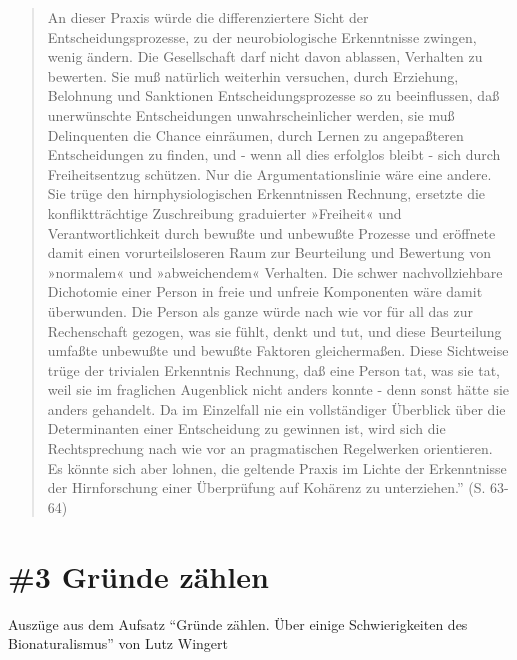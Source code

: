 \documentclass[
  a4paper,
]{report}
\begin{document}
\begin{quote}
An dieser Praxis würde die differenziertere Sicht der Entscheidungsprozesse, zu der neurobiologische Erkenntnisse zwingen, wenig ändern. Die Gesellschaft darf nicht davon ablassen, Verhalten zu bewerten. Sie muß natürlich weiterhin versuchen, durch Erziehung, Belohnung und Sanktionen Entscheidungsprozesse so zu beeinflussen, daß unerwünschte Entscheidungen unwahrscheinlicher werden, sie muß Delinquenten die Chance einräumen, durch Lernen zu angepaßteren Entscheidungen zu finden, und - wenn all dies erfolglos bleibt - sich durch Freiheitsentzug schützen. Nur die Argumentationslinie wäre eine andere. Sie trüge den hirnphysiologischen Erkenntnissen Rechnung, ersetzte die konfliktträchtige Zuschreibung graduierter »Freiheit« und Verantwortlichkeit durch bewußte und unbewußte Prozesse und eröffnete damit einen vorurteilsloseren Raum zur Beurteilung und Bewertung von »normalem« und »abweichendem« Verhalten. Die schwer nachvollziehbare Dichotomie einer Person in freie und unfreie Komponenten wäre damit überwunden. Die Person als ganze würde nach wie vor für all das zur Rechenschaft gezogen, was sie fühlt, denkt und tut, und diese Beurteilung umfaßte unbewußte und bewußte Faktoren gleichermaßen. Diese Sichtweise trüge der trivialen Erkenntnis Rechnung, daß eine Person tat, was sie tat, weil sie im fraglichen Augenblick nicht anders konnte - denn sonst hätte sie anders gehandelt. Da im Einzelfall nie ein vollständiger Überblick über die Determinanten einer Entscheidung zu gewinnen ist, wird sich die Rechtsprechung nach wie vor an pragmatischen Regelwerken orientieren. Es könnte sich aber lohnen, die geltende Praxis im Lichte der Erkenntnisse der Hirnforschung einer Überprüfung auf Kohärenz zu unterziehen.'' (S. 63-64)
\end{quote}

\hypertarget{pr-ev3}{%
\section{\#3 Gründe zählen}\label{pr-ev3}}

Auszüge aus dem Aufsatz ``Gründe zählen. Über einige Schwierigkeiten des Bionaturalismus'' von Lutz Wingert \citeyearpar{Lutz2004}
\end{document}
